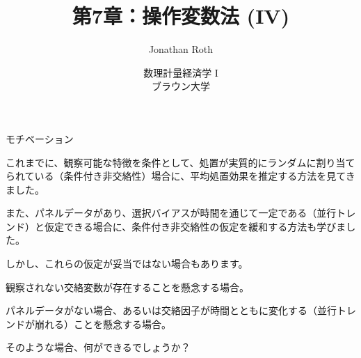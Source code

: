 \documentclass[11pt,handout]{beamer}
\newenvironment{wideitemize}{\itemize\addtolength{\itemsep}{10pt}}{\enditemize}
\begin{document}
	
	\begin{frame}[noframenumbering]{}
		\vspace{0.5cm}
		\title[]{第7章：操作変数法 (IV)}
		\author{Jonathan Roth}
		\date{数理計量経済学 I \\ ブラウン大学\\} 
		\titlepage {\small{}\ }\thispagestyle{empty} \vspace{-30pt}
		
	\end{frame}
	
	
	\begin{frame}{モチベーション}
		
		\begin{wideitemize}
			\item
			これまでに、観察可能な特徴を条件として、処置が実質的にランダムに割り当てられている（条件付き非交絡性）場合に、平均処置効果を推定する方法を見てきました。
			
			\item
			また、パネルデータがあり、選択バイアスが時間を通じて一定である（並行トレンド）と仮定できる場合に、条件付き非交絡性の仮定を緩和する方法も学びました。
			
			
			\pause
			
			\item
			しかし、これらの仮定が妥当ではない場合もあります。
			
			\pause
				\begin{itemize}
					{\normalsize					
					\item
					観察されない交絡変数が存在することを懸念する場合。
					
					\item
					パネルデータがない場合、あるいは交絡因子が時間とともに変化する（並行トレンドが崩れる）ことを懸念する場合。
					} 
				\end{itemize}			
			
			
			\pause
			
			\item
			そのような場合、何ができるでしょうか？ 
		\end{wideitemize}
		
	\end{frame}
	
\end{document}
